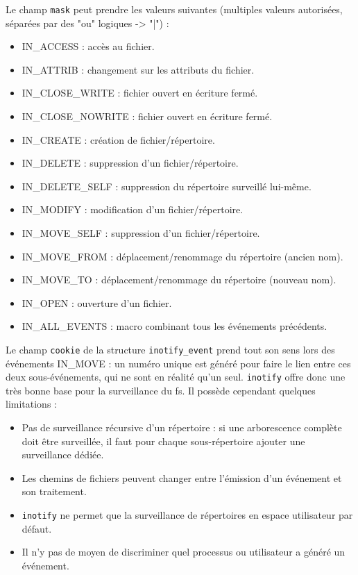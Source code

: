 \documentclass[a4paper, 12pt]{article}
\begin{document}
\bigbreak
Le champ \texttt{mask} peut prendre les valeurs suivantes (multiples valeurs autorisées, 
séparées par des "ou" logiques -> "|") :
\begin{itemize}
    \item IN\_ACCESS : accès au fichier.
    \item IN\_ATTRIB : changement sur les attributs du fichier.
    \item IN\_CLOSE\_WRITE : fichier ouvert en écriture fermé.
    \item IN\_CLOSE\_NOWRITE : fichier ouvert en écriture fermé.
    \item IN\_CREATE : création de fichier/répertoire.
    \item IN\_DELETE : suppression d'un fichier/répertoire.
    \item IN\_DELETE\_SELF : suppression du répertoire surveillé lui-même.
    \item IN\_MODIFY : modification d'un fichier/répertoire.
    \item IN\_MOVE\_SELF : suppression d'un fichier/répertoire.
    \item IN\_MOVE\_FROM : déplacement/renommage du répertoire (ancien nom).
    \item IN\_MOVE\_TO : déplacement/renommage du répertoire (nouveau nom).
    \item IN\_OPEN : ouverture d'un fichier.
    \item IN\_ALL\_EVENTS : macro combinant tous les événements précédents.
\end{itemize}
Le champ \texttt{cookie} de la structure \texttt{inotify_event} prend tout son sens 
lors des événements IN\_MOVE : un numéro unique est généré pour faire le lien entre ces deux 
sous-événements, qui ne sont en réalité qu'un seul. \texttt{inotify} offre donc une très bonne base pour 
la surveillance du \acrshort{fs}. Il possède cependant quelques limitations :
\begin{itemize}
    \item Pas de surveillance récursive d'un répertoire : si une arborescence complète doit être 
        surveillée, il faut pour chaque sous-répertoire ajouter une surveillance dédiée.
    \item Les chemins de fichiers peuvent changer entre l'émission d'un événement et son traitement.
    \item \texttt{inotify} ne permet que la surveillance de répertoires en espace utilisateur par défaut.
    \item Il n'y pas de moyen de discriminer quel processus ou utilisateur a généré un événement.
\end{itemize}
\end{document}
